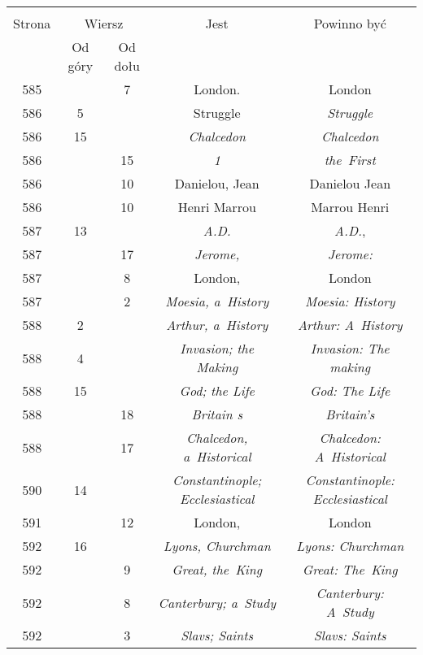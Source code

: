 \documentclass[a4paper,11pt]{article}
\begin{document}
\begin{center}
  \begin{tabular}{|c|c|c|c|c|}
    \hline
    & \multicolumn{2}{c|}{} & & \\
    Strona & \multicolumn{2}{c|}{Wiersz} & Jest
                              & Powinno być \\ \cline{2-3}
    & Od góry & Od dołu & & \\
    \hline
    585 & &  7 & London. & London \\
    586 &  5 & & Struggle & \textit{Struggle} \\
    586 & 15 & & \textit{Chalcedon} & \textit{Chalcedon} \\
    586 & & 15 & \textit{1} & \textit{the~First} \\
    586 & & 10 & Danielou, Jean & Danielou Jean \\
    586 & & 10 & Henri Marrou & Marrou Henri \\
    587 & 13 & & \textit{A.D.} & \textit{A.D.}, \\
    587 & & 17 & \textit{Jerome,} & \textit{Jerome:} \\
    587 & &  8 & London, & London \\
    587 & &  2 & \textit{Moesia, a~History} & \textit{Moesia: History} \\
    588 &  2 & & \textit{Arthur, a~History} & \textit{Arthur: A~History} \\
    588 &  4 & & \textit{Invasion; the Making}
           & \textit{Invasion: The making} \\
    588 & 15 & & \textit{God; the Life} & \textit{God: The Life} \\
    588 & & 18 & \textit{Britain s} & \textit{Britain's} \\
    588 & & 17 & \textit{Chalcedon, a~Historical}
           & \textit{Chalcedon: A~Historical} \\
    590 & 14 & & \textit{Constantinople; Ecclesiastical}
           & \textit{Constantinople: Ecclesiastical} \\
    591 & & 12 & London, & London \\
    592 & 16 & & \textit{Lyons, Churchman} & \textit{Lyons: Churchman} \\
    592 & &  9 & \textit{Great, the~King} & \textit{Great: The~King} \\
    592 & &  8 & \textit{Canterbury; a~Study}
           & \textit{Canterbury: A~Study} \\
    592 & &  3 & \textit{Slavs; Saints} & \textit{Slavs: Saints} \\

\end{tabular}
\end{center}
\end{document}
